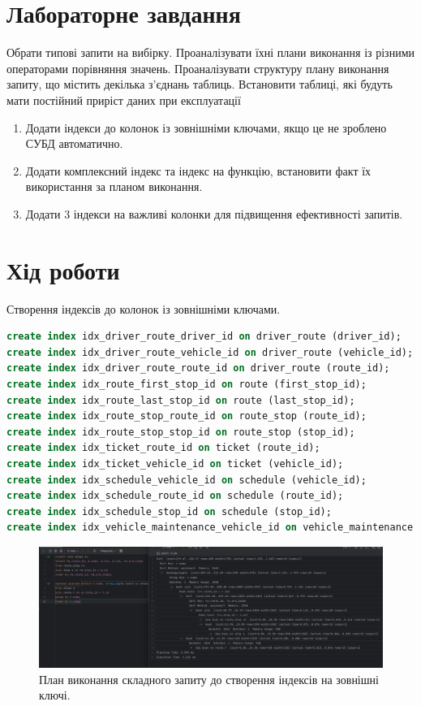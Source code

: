 \documentclass[14pt]{extreport}
\begin{document}
\begin{normalsize}
	\section*{Лабораторне завдання}
	Обрати типові запити на вибірку. Проаналізувати їхні плани виконання із різними операторами порівняння значень. Проаналізувати структуру плану виконання запиту, що містить декілька з’єднань таблиць. Встановити таблиці, які будуть мати постійний приріст даних при експлуатації
	
	\begin{enumerate}
\item Додати індекси до колонок із зовнішніми ключами, якщо це не зроблено СУБД автоматично.
\item Додати комплексний індекс та індекс на функцію, встановити факт їх використання за планом виконання.
\item Додати 3 індекси на важливі колонки для підвищення ефективності запитів.
	\end{enumerate}
	
	\section*{Хід роботи}
	
	Створення індексів до колонок із зовнішніми ключами.
	\begin{small}
		\begin{lstlisting}[language=sql]
create index idx_driver_route_driver_id on driver_route (driver_id);
create index idx_driver_route_vehicle_id on driver_route (vehicle_id);
create index idx_driver_route_route_id on driver_route (route_id);
create index idx_route_first_stop_id on route (first_stop_id);
create index idx_route_last_stop_id on route (last_stop_id);
create index idx_route_stop_route_id on route_stop (route_id);
create index idx_route_stop_stop_id on route_stop (stop_id);
create index idx_ticket_route_id on ticket (route_id);
create index idx_ticket_vehicle_id on ticket (vehicle_id);
create index idx_schedule_vehicle_id on schedule (vehicle_id);
create index idx_schedule_route_id on schedule (route_id);
create index idx_schedule_stop_id on schedule (stop_id);
create index idx_vehicle_maintenance_vehicle_id on vehicle_maintenance (vehicle_id);
		\end{lstlisting}
	\end{small}

	\begin{figure}[H]
		\centering
		\includegraphics[scale=0.38]{5}
		\caption{План виконання складного запиту до створення індексів на зовнішні ключі.}
	\end{figure}
	

\end{normalsize}
\end{document}

